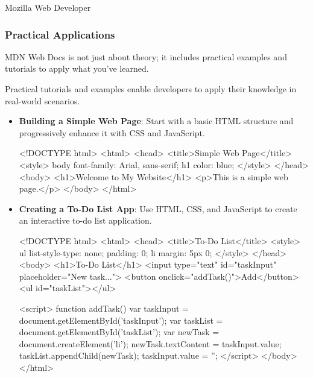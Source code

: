 \begin{notes}{Mozilla Web Developer}
\begin{highlight}
    \end{highlight}
    
    \subsubsection*{Practical Applications}
    
    MDN Web Docs is not just about theory; it includes practical examples and tutorials to apply what you've learned.
    
    \begin{highlight}
    
        Practical tutorials and examples enable developers to apply their knowledge in real-world scenarios.
        
        \begin{itemize}
            \item \textbf{Building a Simple Web Page}: Start with a basic HTML structure and progressively enhance it with CSS and JavaScript.
    \begin{code}[HTML]
    <!DOCTYPE html>
    <html>
        <head>
            <title>Simple Web Page</title>
            <style>
                body { font-family: Arial, sans-serif; }
                h1 { color: blue; }
            </style>
        </head>
        <body>
            <h1>Welcome to My Website</h1>
            <p>This is a simple web page.</p>
        </body>
    </html>
    \end{code}
            \item \textbf{Creating a To-Do List App}: Use HTML, CSS, and JavaScript to create an interactive to-do list application.
    \begin{code}[HTML]
    <!DOCTYPE html>
    <html>
        <head>
            <title>To-Do List</title>
            <style>
                ul { list-style-type: none; padding: 0; }
                li { margin: 5px 0; }
            </style>
        </head>
        <body>
            <h1>To-Do List</h1>
            <input type="text" id="taskInput" placeholder="New task...">
            <button onclick="addTask()">Add</button>
            <ul id="taskList"></ul>

            <script>
                function addTask() {
                    var taskInput = document.getElementById('taskInput');
                    var taskList = document.getElementById('taskList');
                    var newTask = document.createElement('li');
                    newTask.textContent = taskInput.value;
                    taskList.appendChild(newTask);
                    taskInput.value = '';
                }
            </script>
        </body>
    </html>
    \end{code}
        \end{itemize}
    

\end{highlight}
\end{notes}
